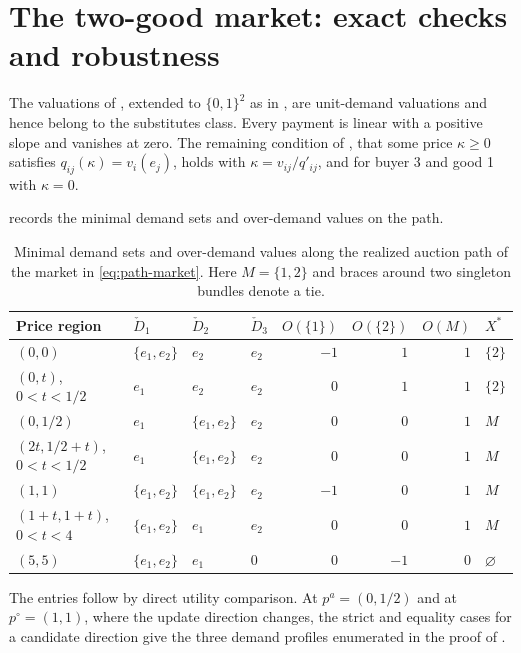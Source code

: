 \documentclass[11pt,a4paper,fleqn]{article}
\theoremstyle{plain}
\theoremstyle{definition}
\begin{document}
\section{The two-good market: exact checks and robustness}\label{app:two-good-checks}

The valuations of , extended to $\{0,1\}^2$ as in , are unit-demand valuations and hence belong to the substitutes class. Every payment is linear with a positive slope and vanishes at zero. The remaining condition of \citet{okisato2026}, that some price $\kappa\ge0$ satisfies $q_{ij}(\kappa)=v_i(e_j)$, holds with $\kappa=v_{ij}/q'_{ij}$, and for buyer 3 and good 1 with $\kappa=0$.

 records the minimal demand sets and over-demand values on the path.
\begin{table}[!ht]
\centering
\caption{Minimal demand sets and over-demand values along the realized auction path of the market in \eqref{eq:path-market}. Here $M=\{1,2\}$ and braces around two singleton bundles denote a tie.}
\label{tab:path-checks}
\small
\begin{tabular}{@{}llllrrrl@{}}
\toprule
Price region & $\check D_1$ & $\check D_2$ & $\check D_3$
& $O(\{1\})$ & $O(\{2\})$ & $O(M)$ & $X^*$\\
\midrule
$(0,0)$ & $\{e_1,e_2\}$ & $e_2$ & $e_2$ & $-1$ & $1$ & $1$ & $\{2\}$\\
$(0,t)$, $0<t<1/2$ & $e_1$ & $e_2$ & $e_2$ & $0$ & $1$ & $1$ & $\{2\}$\\
$(0,1/2)$ & $e_1$ & $\{e_1,e_2\}$ & $e_2$ & $0$ & $0$ & $1$ & $M$\\
$(2t,1/2+t)$, $0<t<1/2$ & $e_1$ & $\{e_1,e_2\}$ & $e_2$ & $0$ & $0$ & $1$ & $M$\\
$(1,1)$ & $\{e_1,e_2\}$ & $\{e_1,e_2\}$ & $e_2$ & $-1$ & $0$ & $1$ & $M$\\
$(1+t,1+t)$, $0<t<4$ & $\{e_1,e_2\}$ & $e_1$ & $e_2$ & $0$ & $0$ & $1$ & $M$\\
$(5,5)$ & $\{e_1,e_2\}$ & $e_1$ & $0$ & $0$ & $-1$ & $0$ & $\varnothing$\\
\bottomrule
\end{tabular}
\end{table}
The entries follow by direct utility comparison. At $p^a=(0,1/2)$ and at $p^\circ=(1,1)$, where the update direction changes, the strict and equality cases for a candidate direction give the three demand profiles enumerated in the proof of .
\end{document}
